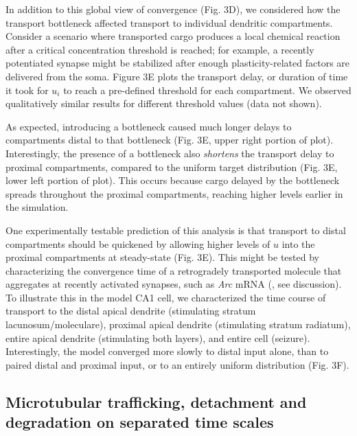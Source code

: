 \documentclass[10pt]{wlpeerj}
\begin{document}
In addition to this global view of convergence (Fig. 3D), we considered how the transport bottleneck affected transport to individual dendritic compartments.
Consider a scenario where transported cargo produces a local chemical reaction after a critical concentration threshold is reached; for example, a recently potentiated synapse might be stabilized after enough plasticity-related factors are delivered from the soma.
Figure 3E plots the transport delay, or duration of time it took for $u_i$ to reach a pre-defined threshold for each compartment.
We observed qualitatively similar results for different threshold values (data not shown).

As expected, introducing a bottleneck caused much longer delays to compartments distal to that bottleneck (Fig. 3E, upper right portion of plot).
Interestingly, the presence of a bottleneck also \textit{shortens} the transport delay to proximal compartments, compared to the uniform target distribution (Fig. 3E, lower left portion of plot).
This occurs because cargo delayed by the bottleneck spreads throughout the proximal compartments, reaching higher levels earlier in the simulation.

One experimentally testable prediction of this analysis is that transport to distal compartments should be quickened by allowing higher levels of $u$ into the proximal compartments at steady-state (Fig. 3E).
This might be tested by characterizing the convergence time of a retrogradely transported molecule that aggregates at recently activated synapses, such as \textit{Arc} mRNA (\citet{Steward_1998}, see discussion).
To illustrate this in the model CA1 cell, we characterized the time course of transport to the distal apical dendrite (stimulating stratum lacunosum/moleculare), proximal apical dendrite (stimulating stratum radiatum), entire apical dendrite (stimulating both layers), and entire cell (seizure). Interestingly, the model converged more slowly to distal input alone, than to paired distal and proximal input, or to an entirely uniform distribution (Fig. 3F).

\subsection*{Microtubular trafficking, detachment and degradation on separated time scales}
\end{document}
